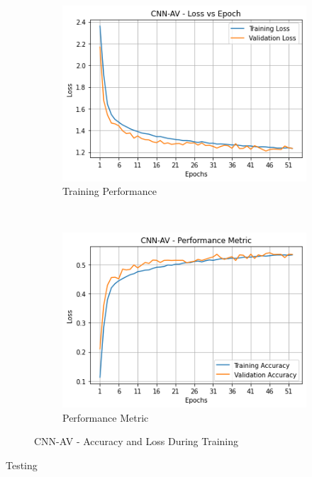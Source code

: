 \documentclass[journal,onecolumn]{IEEEtran}
\begin{document}
\begin{figure}[h]
    \centering
    \begin{subfigure}[b]{0.4\textwidth}
        \centering
        \includegraphics[scale=0.5]{cnnavPerf}
        \caption{Training Performance}
    \end{subfigure}%
    ~ 
    \begin{subfigure}[b]{0.4\textwidth}
        \centering
        \includegraphics[scale=0.5]{cnnavPerfMet}
        \caption{Performance Metric}
    \end{subfigure}
    \caption{CNN-AV - Accuracy and Loss During Training}
\end{figure}

Testing
\end{document}
